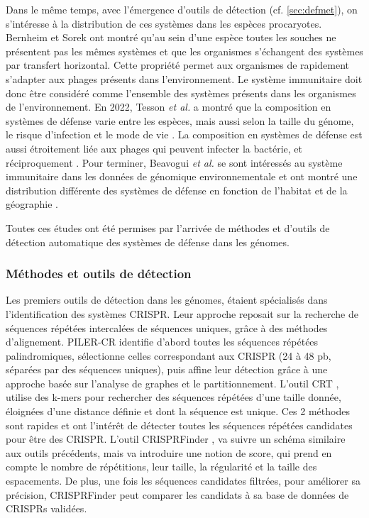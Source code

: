 Dans le même temps, avec l'émergence d'outils de détection (cf. \autoref{sec:defmet}), on s'intéresse à la distribution de ces systèmes dans les espèces procaryotes. Bernheim et Sorek \cite{bernheim_pan-immune_2020} ont montré qu'au sein d'une espèce toutes les souches ne présentent pas les mêmes systèmes et que les organismes s'échangent des systèmes par transfert horizontal. Cette propriété permet aux organismes de rapidement s'adapter aux phages présents dans l'environnement. Le système immunitaire doit donc être considéré comme l'ensemble des systèmes présents dans les organismes de l'environnement. En 2022, Tesson \textit{et al.} a montré que la composition en systèmes de défense varie entre les espèces, mais aussi selon la taille du génome, le risque d'infection et le mode de vie \cite{tesson_systematic_2022}. La composition en systèmes de défense est aussi étroitement liée aux phages qui peuvent infecter la bactérie, et réciproquement \cite{srikant_evolution_2022}. Pour terminer, Beavogui \textit{et al.} se sont intéressés au système immunitaire dans les données de génomique environnementale et ont montré une distribution différente des systèmes de défense en fonction de l'habitat et de la géographie \cite{beavogui_defensome_2024}.

Toutes ces études ont été permises par l'arrivée de méthodes et d'outils de détection automatique des systèmes de défense dans les génomes.

\subsubsection{Méthodes et outils de détection}
\label{sec:defmet}

Les premiers outils de détection dans les génomes, étaient spécialisés dans l'identification des systèmes CRISPR. Leur approche reposait sur la recherche de séquences répétées intercalées de séquences uniques, grâce à des méthodes d’alignement. PILER-CR \cite{edgar_piler-cr_2007} identifie d'abord toutes les séquences répétées palindromiques, sélectionne celles correspondant aux CRISPR (24 à 48 pb, séparées par des séquences uniques), puis affine leur détection grâce à une approche basée sur l’analyse de graphes et le partitionnement. L'outil CRT \cite{bland_crispr_2007}, utilise des k-mers pour rechercher des séquences répétées d'une taille donnée, éloignées d'une distance définie et dont la séquence est unique. Ces 2 méthodes sont rapides et ont l'intérêt de détecter toutes les séquences répétées candidates pour être des CRISPR. L'outil CRISPRFinder \cite{grissa_crisprfinder_2007}, va suivre un schéma similaire aux outils précédents, mais va introduire une notion de score, qui prend en compte le nombre de répétitions, leur taille, la régularité et la taille des espacements. De plus, une fois les séquences candidates filtrées, pour améliorer sa précision, CRISPRFinder peut comparer les candidats à sa base de données de CRISPRs validées.

